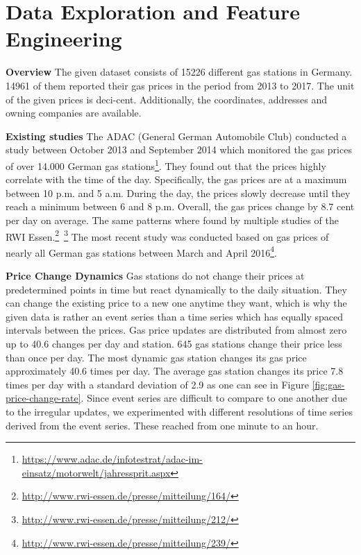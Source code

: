 \documentclass[%
a4paper,
DIV12,
2.5headlines,
bigheadings,
titlepage,
openbib,
]{scrartcl}
\newcommand{\bscom}[2]{%
  \st{#1}{\color{blue}\fontsize{8}{8}\selectfont\,#2}}
\begin{document}
\section{Data Exploration and Feature Engineering}\label{data-exploration}

\textbf{Overview} The given dataset consists of 15226 different gas stations in Germany.
14961 of them reported their gas prices in the period from 2013 to 2017.
The unit of the given prices is deci-cent.
Additionally, the coordinates, addresses and owning companies are available.

\textbf{Existing studies}
The ADAC (General German Automobile Club) conducted a study between October 2013 and September 2014 which monitored the gas prices of over 14.000 German gas stations\footnote{\url{https://www.adac.de/infotestrat/adac-im-einsatz/motorwelt/jahressprit.aspx}}.
They found out that the prices highly correlate with the time of the day.
Specifically, the gas prices are at a maximum between 10 p.m. and 5 a.m.
During the day, the prices slowly decrease until they reach a minimum between 6 and 8 p.m.
Overall, the gas prices change by 8.7 cent per day on average.
The same patterns where found by multiple studies of the RWI Essen.\footnote{\url{http://www.rwi-essen.de/presse/mitteilung/164/}}~\footnote{\url{http://www.rwi-essen.de/presse/mitteilung/212/}}
The most recent study was conducted based on gas prices of nearly all German gas stations between March and April 2016\footnote{\url{http://www.rwi-essen.de/presse/mitteilung/239/}}.

\textbf{Price Change Dynamics} 
Gas stations do not change their prices at predetermined points in time but react dynamically to the daily situation.
They can change the existing price to a new one anytime they want, which is why the given data is rather an event series than a time series which has equally spaced intervals between the prices.
Gas price updates are distributed from almost zero up to 40.6 changes per day and station.
645 gas stations change their price less than once per day.
The most dynamic gas station changes its gas price approximately 40.6 times per day.
The average gas station changes its price 7.8 times per day with a standard deviation of 2.9 as one can see in Figure \ref{fig:gas-price-change-rate}.
Since event series are difficult to compare to one another due to the irregular updates, we experimented with different resolutions of time series derived from the event series.
These reached from one minute to an hour.
\end{document}
